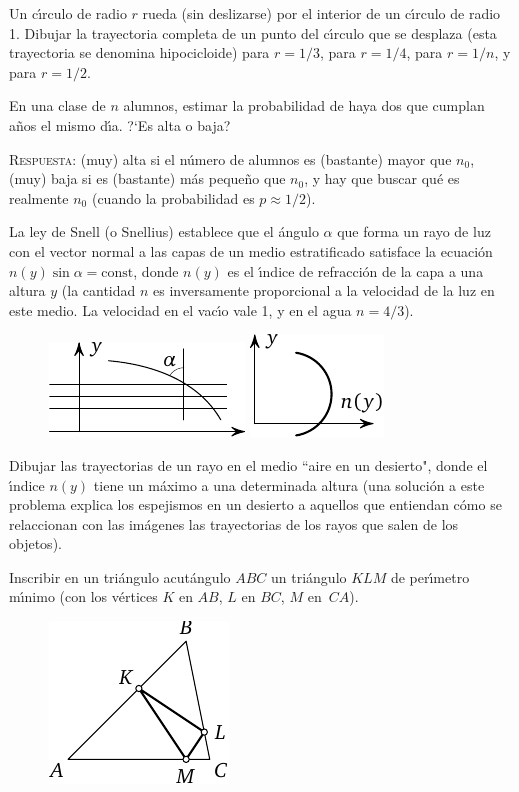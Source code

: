 \documentclass[12pt, spanish]{article}  %
\begin{document}
\bigskip
{} Un c\'{\i}rculo de radio $r$ rueda (sin deslizarse) por el interior de un c\'{\i}rculo de radio 1.
Dibujar la trayectoria completa de un punto del c\'{\i}rculo que se desplaza (esta trayectoria se denomina hipocicloide) 
para $r=1/3$, para $r=1/4$, para $r=1/n$, y para $r=1/2$.

\bigskip
{} En una clase de $n$ alumnos, estimar la probabilidad de haya dos que cumplan a\~nos el mismo d\'{\i}a. ?`Es alta o baja?

\medskip
\textsc{Respuesta:} (muy) alta si el n\'umero de alumnos es (bastante) mayor que $n_0$,
(muy) baja si es (bastante) m\'as peque\~no que $n_0$, y hay que buscar qu\'e es realmente $n_0$ (cuando la probabilidad es $p \approx 1/2$).

\bigskip
{} La ley de Snell (o Snellius) establece que el \'angulo $\alpha$ que forma un rayo de luz con el vector normal a las capas de un medio estratificado satisface la ecuaci\'on $n(y) \sin \alpha=\text{const}$,
donde $n(y)$ es el \'{\i}ndice de refracci\'on de la capa a una altura $y$ (la cantidad $n$ es 
inversamente proporcional a la velocidad 
de la luz en este medio. La velocidad en el vac\'{\i}o vale 1, y en el agua $n=4/3$).
\begin{figure}[h]
\centering
\includegraphics{taskbook-47}\hskip2cm
\includegraphics{taskbook-471}
\end{figure}

Dibujar las trayectorias de un rayo en el medio ``aire en un desierto", donde el \'{\i}ndice $n(y)$ tiene un m\'aximo 
a una determinada altura
(una soluci\'on a este problema explica los espejismos en un desierto a aquellos que entiendan c\'omo se relaccionan con las im\'agenes las trayectorias de los rayos que salen de los objetos).

\newpage
{} Inscribir en un tri\'angulo acut\'angulo $ABC$ un tri\'angulo $KLM$ de per\'{\i}metro m\'{\i}nimo
(con los v\'ertices $K$ en $AB$, $L$ en $BC$, $M$ en~$CA$).
\begin{figure}[h]
\centering
\includegraphics{taskbook-48} 
\end{figure}
\end{document}
